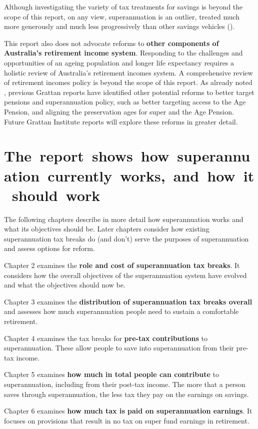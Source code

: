 Although investigating the variety of tax treatments for savings is beyond the scope of this report, on any view, superannuation is an outlier, treated much more generously and much less progressively than other savings vehicles ().

This report also does not advocate reforms to \textbf{other components of Australia’s retirement income system}. Responding to the challenges and opportunities of an ageing population and longer life expectancy requires a holistic review of Australia’s retirement incomes system. A comprehensive review of retirement incomes policy is beyond the scope of this report. As already noted , previous Grattan reports have identified other potential reforms to better target pensions and superannuation policy, such as better targeting access to the Age Pension, and aligning the preservation ages for super and the Age Pension. Future Grattan Institute reports will explore these reforms in greater detail. 

\section{\mbox{The report shows how superannuation currently works, and how it should work}}
The following chapters describe in more detail how superannuation works and what its objectives should be. Later chapters consider how existing superannuation tax breaks do (and don’t) serve the purposes of superannuation and assess options for reform.

Chapter 2 examines the \textbf{role and cost of superannuation tax breaks}. It considers how the overall objectives of the superannuation system have evolved and what the objectives should now be.

Chapter 3 examines the \textbf{distribution of superannuation tax breaks overall} and assesses how much superannuation people need to sustain a comfortable retirement.  

Chapter 4 examines the tax breaks for \textbf{pre-tax contributions} to superannuation. These allow people to save into superannuation from their pre-tax income.

Chapter 5 examines \textbf{how much in total people can contribute} to superannuation, including from their post-tax income. The more that a person saves through superannuation, the less tax they pay on the earnings on savings.

Chapter 6 examines \textbf{how much tax is paid on superannuation earnings}. It focuses on provisions that result in no tax on super fund earnings in retirement.

